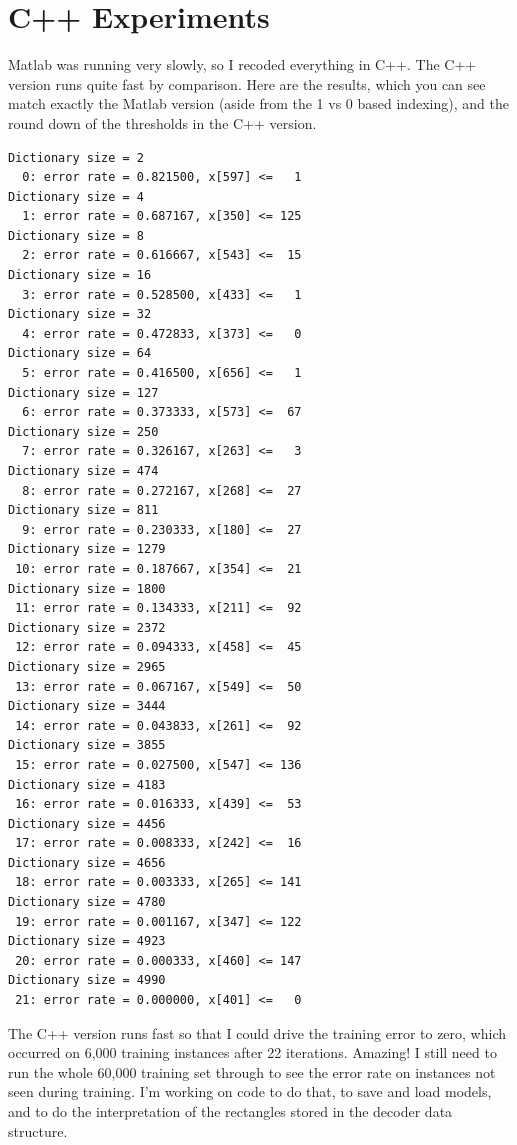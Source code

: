 \documentclass{article}
\begin{document}
\section{C++ Experiments}

Matlab was running very slowly, so I recoded everything in C++.  The C++ version runs quite fast by comparison.  Here are the results, which you can see match exactly the Matlab version (aside from the 1 vs 0 based indexing), and the round down of the thresholds in the C++ version.

\begin{verbatim}
Dictionary size = 2
  0: error rate = 0.821500, x[597] <=   1
Dictionary size = 4
  1: error rate = 0.687167, x[350] <= 125
Dictionary size = 8
  2: error rate = 0.616667, x[543] <=  15
Dictionary size = 16
  3: error rate = 0.528500, x[433] <=   1
Dictionary size = 32
  4: error rate = 0.472833, x[373] <=   0
Dictionary size = 64
  5: error rate = 0.416500, x[656] <=   1
Dictionary size = 127
  6: error rate = 0.373333, x[573] <=  67
Dictionary size = 250
  7: error rate = 0.326167, x[263] <=   3
Dictionary size = 474
  8: error rate = 0.272167, x[268] <=  27
Dictionary size = 811
  9: error rate = 0.230333, x[180] <=  27
Dictionary size = 1279
 10: error rate = 0.187667, x[354] <=  21
Dictionary size = 1800
 11: error rate = 0.134333, x[211] <=  92
Dictionary size = 2372
 12: error rate = 0.094333, x[458] <=  45
Dictionary size = 2965
 13: error rate = 0.067167, x[549] <=  50
Dictionary size = 3444
 14: error rate = 0.043833, x[261] <=  92
Dictionary size = 3855
 15: error rate = 0.027500, x[547] <= 136
Dictionary size = 4183
 16: error rate = 0.016333, x[439] <=  53
Dictionary size = 4456
 17: error rate = 0.008333, x[242] <=  16
Dictionary size = 4656
 18: error rate = 0.003333, x[265] <= 141
Dictionary size = 4780
 19: error rate = 0.001167, x[347] <= 122
Dictionary size = 4923
 20: error rate = 0.000333, x[460] <= 147
Dictionary size = 4990
 21: error rate = 0.000000, x[401] <=   0
\end{verbatim}

The C++ version runs fast so that I could drive the training error to zero, which occurred on 6,000 training instances after 22 iterations.  Amazing!   I still need to run the whole 60,000 training set through to see the error rate on instances not seen during training.  I'm working on code to do that, to save and load models, and to do the interpretation of the rectangles stored in the decoder data structure.



\end{document}
